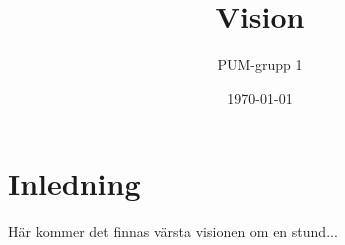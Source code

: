 

\ifpdf
\else
\fi

\title{Vision}
\author{PUM-grupp 1}
\date{\today}



\maketitle\thispagestyle{empty}

\section{Inledning}
Här kommer det finnas värsta visionen om en stund...

